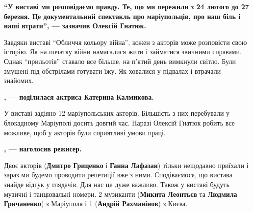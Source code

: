 \begin{leftbar}
	\begingroup
		\bfseries
\enquote{У виставі ми розповідаємо правду. Те, що ми пережили з 24 лютого до 27
березня. Це документальний спектакль про маріупольців, про наш біль і
наші втрати}, — зазначив Олексій Гнатюк.
	\endgroup
\end{leftbar}


Завдяки виставі \enquote{Обличчя кольору війна}, кожен з акторів може розповісти свою
історію. Як на початку війни намагалися жити і займатися звичними справами.
Однак \enquote{прильотів} ставало все більше, на п'ятий день вимкнули світло. Були
змушені під обстрілами готувати їжу. Як ховалися у підвалах і втрачали
знайомих.

\begin{leftbar}
	\begingroup
		\bfseries
{}, — поділилася актриса Катерина Калмикова.
	\endgroup
\end{leftbar}


У виставі задіяно 12 маріупольських акторів. Більшість з них перебували у
блокадному Маріуполі досить довгий час. Наразі Олексій Гнатюк робить все
можливе, щоб у акторів були сприятливі умови праці. 

\begin{leftbar}
	\begingroup
		\bfseries
{}, — наголосив режисер. 
	\endgroup
\end{leftbar}

Двоє акторів (\textbf{Дмитро Гриценко} і \textbf{Ганна Лафазан}) тільки нещодавно приїхали і
зараз ми будемо проводити репетиції вже з ними. Сподіваємося, що вистава знайде
відгук у глядачів. Для нас це дуже важливо. Також у виставі будуть музичні і
танцювальні номери. 2 музиканти (\textbf{Микита Леонтьєв} та \textbf{Людмила Гричаненко}) з
Маріуполя і 1 (\textbf{Андрій Рахманінов}) з Києва.

